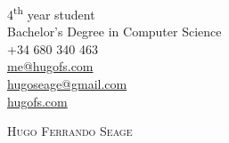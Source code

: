 \documentclass[a4paper, 11pt]{article}
\begin{document}
\pagestyle{empty} %

\begin{flushright}
    4\textsuperscript{th} year student\\
    Bachelor's Degree in Computer Science\\
    +34 680 340 463\\
    \href{mailto: me@hugofs.com}{me@hugofs.com}\\
    \href{mailto: hugoseage@gmail.com}{hugoseage@gmail.com}\\
    \href{https://hugofs.com}{hugofs.com}\\
\end{flushright}

\vspace{-40mm}

\begin{figure}[ht!]
    \begin{flushleft}
    \end{flushleft}
\end{figure}

{\textsc {\Huge \vspace{5mm} \hspace{-13mm} Hugo Ferrando Seage}}\\
\end{document}

